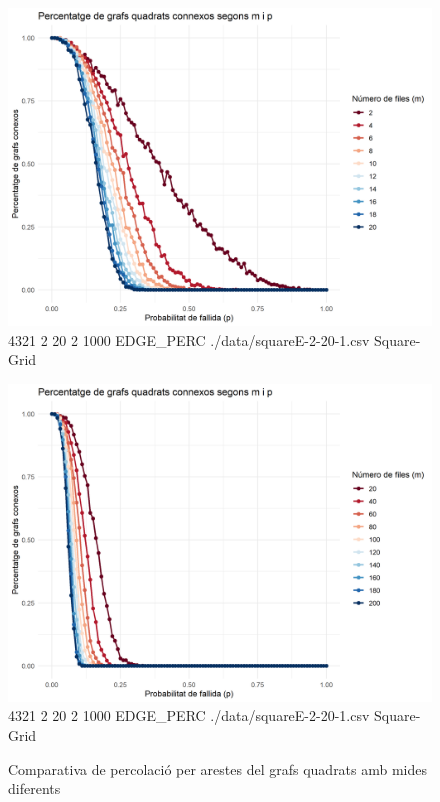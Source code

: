 \documentclass[a4paper]{article}
\begin{document}
	\begin{figure}[H]
		\centering
		\begin{minipage}{0.45\textwidth}
			\centering
			\includegraphics[width=\textwidth]{images/squareE-2-20-1}
			\footnotesize{4321 2 20 2 1000 EDGE\_PERC ./data/squareE-2-20-1.csv Square-Grid}
		\end{minipage}
		\hfill
		\begin{minipage}{0.45\textwidth}
			\centering
			\includegraphics[width=\textwidth]{images/squareE-20-200}
			\footnotesize{4321 2 20 2 1000 EDGE\_PERC ./data/squareE-2-20-1.csv Square-Grid}
		\end{minipage}
		\caption{Comparativa de percolació per arestes del grafs quadrats amb mides diferents}
		\label{fig:percolation_edges_square}
	\end{figure}
	
\end{document}
